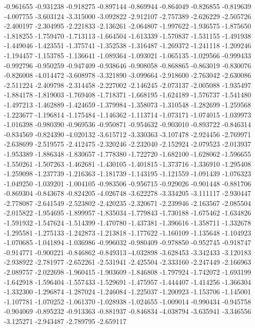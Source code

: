 -0.961655
-0.931238
-0.918275
-0.897144
-0.869944
-0.864049
-0.826855
-0.819639
-4.007755
-3.603124
-3.315000
-3.092822
-2.912107
-2.757389
-2.626229
-2.505726
-2.400197
-2.304995
-2.221833
-2.136261
-2.064807
-1.997622
-1.936575
-1.875650
-1.818255
-1.759470
-1.713113
-1.664504
-1.613339
-1.570837
-1.531155
-1.491938
-1.449046
-1.423551
-1.375741
-1.352538
-1.316487
-1.269372
-1.241118
-1.209246
-1.194457
-1.153785
-1.136641
-1.089364
-1.093021
-1.065135
-1.029566
-0.999433
-0.992796
-0.950259
-0.947409
-0.938646
-0.908058
-0.868865
-0.863019
-0.830076
-0.826008
-4.014472
-3.608978
-3.321890
-3.099664
-2.918600
-2.763042
-2.630086
-2.511224
-2.409798
-2.314458
-2.227002
-2.146245
-2.073137
-2.005088
-1.935497
-1.884178
-1.819003
-1.769408
-1.718371
-1.668195
-1.624189
-1.576737
-1.541480
-1.497213
-1.462889
-1.424659
-1.379984
-1.358073
-1.310548
-1.282699
-1.259568
-1.223677
-1.196814
-1.175484
-1.146362
-1.113714
-1.073171
-1.074015
-1.039973
-1.016398
-0.980390
-0.969536
-0.950871
-0.954632
-0.903010
-0.893722
-0.846314
-0.834569
-0.824390
-4.020132
-3.615712
-3.330363
-3.107478
-2.924456
-2.769971
-2.638699
-2.519575
-2.412475
-2.320246
-2.232040
-2.152924
-2.079523
-2.013937
-1.953389
-1.886348
-1.830657
-1.778380
-1.722720
-1.682100
-1.628062
-1.596655
-1.550261
-1.507263
-1.462681
-1.430105
-1.401815
-1.373716
-1.336910
-1.295408
-1.259098
-1.237739
-1.216363
-1.181739
-1.143195
-1.121559
-1.091439
-1.076323
-1.049250
-1.039201
-1.004105
-0.983506
-0.956715
-0.929026
-0.901448
-0.881706
-0.869304
-0.843678
-0.824205
-4.026748
-3.622278
-3.334205
-3.111117
-2.930447
-2.778087
-2.641549
-2.523802
-2.420235
-2.320671
-2.239946
-2.163567
-2.085504
-2.015822
-1.954695
-1.899957
-1.835034
-1.779843
-1.730188
-1.675462
-1.634826
-1.591932
-1.547624
-1.514399
-1.470780
-1.437381
-1.396616
-1.358711
-1.332678
-1.295581
-1.275133
-1.242873
-1.213818
-1.177622
-1.160109
-1.135648
-1.104923
-1.070685
-1.041894
-1.036986
-0.996032
-0.980409
-0.978850
-0.952745
-0.918747
-0.914771
-0.900221
-0.846862
-0.849313
-4.032898
-3.628453
-3.342433
-3.120183
-2.938922
-2.781977
-2.652261
-2.531941
-2.425504
-2.333160
-2.247449
-2.166963
-2.089757
-2.022698
-1.960415
-1.903609
-1.846808
-1.797924
-1.742072
-1.693199
-1.642918
-1.596404
-1.557433
-1.529691
-1.475957
-1.444407
-1.414256
-1.366304
-1.332300
-1.296874
-1.287024
-1.246084
-1.225037
-1.200923
-1.153706
-1.145001
-1.107781
-1.070252
-1.061370
-1.028938
-1.024655
-1.009014
-0.990434
-0.945758
-0.904069
-0.895232
-0.913363
-0.881937
-0.846834
-4.038794
-3.635941
-3.346556
-3.125271
-2.943487
-2.789795
-2.659117
